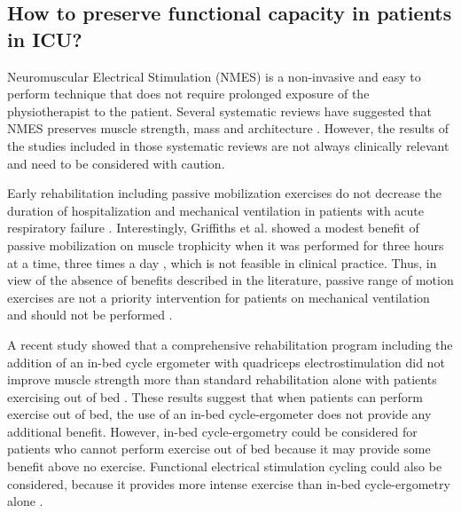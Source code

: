 \subsection{How to preserve functional capacity in patients in ICU?}

Neuromuscular Electrical Stimulation (NMES) is a non-invasive and easy to perform technique that does not require prolonged exposure of the physiotherapist to the patient. Several systematic reviews have suggested that NMES preserves muscle strength, mass and architecture \cite{burke2016evaluation,wageck_application_2014,parry_electrical_2013}. However, the results of the studies included in those systematic reviews are not always clinically relevant and need to be considered with caution\cite{zayed_effects_2020}. 

Early rehabilitation including passive mobilization exercises do not decrease the duration of hospitalization and mechanical ventilation in patients with acute respiratory failure \cite{morris_standardized_2016}. Interestingly, Griffiths et al. showed a modest benefit of passive mobilization on muscle trophicity when it was performed for three hours at a time, three times a day \cite{griffiths1995effect}, which is not feasible in clinical practice. Thus, in view of the absence of benefits described in the literature, passive range of motion exercises are not a priority intervention for patients on mechanical ventilation and should not be performed \cite{medrinal_comparison_2018}. 

A recent study showed that a comprehensive rehabilitation program including the addition of an in-bed cycle ergometer with quadriceps electrostimulation did not improve muscle strength more than standard rehabilitation alone with patients exercising out of bed \cite{fossat_effect_2018}. These results suggest that when patients can perform exercise out of bed, the use of an in-bed cycle-ergometer does not provide any additional benefit. However, in-bed cycle-ergometry could be considered for patients who cannot perform exercise out of bed because it may provide some benefit above no exercise. Functional electrical stimulation cycling could also be considered, because it provides more intense exercise than in-bed cycle-ergometry alone \cite{burtin_early_2009}.

